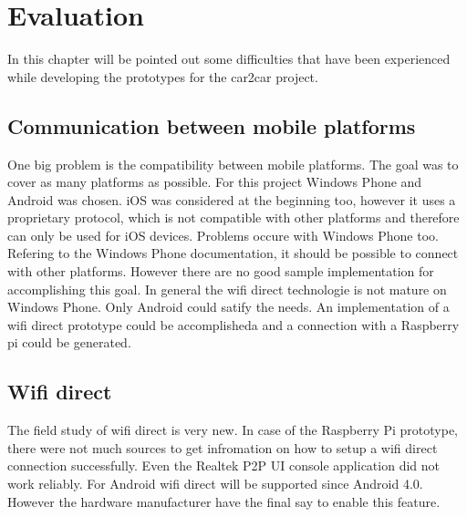 \chapter{Evaluation}
\label{cha:Evaluation}
In this chapter will be pointed out some difficulties that have been experienced while developing the prototypes for the car2car project.

\section{Communication between mobile platforms}
\label{sec:CommunicationBetweenPlattforms}
One big problem is the compatibility between mobile platforms. The goal was to cover as many platforms as possible. For this project Windows Phone and Android was chosen. iOS was considered at the beginning too, however it uses a proprietary protocol, which is not compatible with other platforms and therefore can only be used for iOS devices. Problems occure with Windows Phone too. Refering to the Windows Phone documentation, it should be possible to connect with other platforms. However there are no good sample implementation for accomplishing this goal. In general the wifi direct technologie is not mature on Windows Phone. Only Android could satify the needs. An implementation of a wifi direct prototype could be accomplisheda and a connection with a Raspberry pi could be generated.

\section{Wifi direct}
\label{sec:WifiDirect}
The field study of wifi direct is very new. In case of the Raspberry Pi prototype, there were not much sources to get infromation on how to setup a wifi direct connection successfully. Even the Realtek P2P UI console application did not work reliably. For Android wifi direct will be supported since Android 4.0. However the hardware manufacturer have the final say to enable this feature. 

